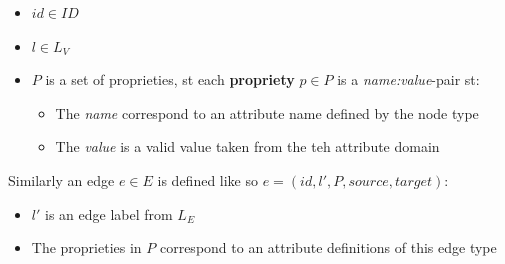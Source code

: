 \begin{itemize}
    \item \(id \in ID\)
    \item \(l \in L_V\)
    \item \(P\) is a set of proprieties, st each \textbf{propriety} \(p \in P\) is a \textit{name:value}-pair st:
    \begin{itemize}
        \item The \textit{name} correspond to an attribute name defined by the node type
        \item The \textit{value} is a valid value taken from the teh attribute domain
    \end{itemize}
\end{itemize}
Similarly an edge \(e \in E\) is defined like so \(e = (id, l', P, source, target)\):
\begin{itemize}
    \item \(l'\) is an edge label from \(L_E\)
    \item The proprieties in \(P\) correspond to an attribute definitions of this edge type
\end{itemize}

